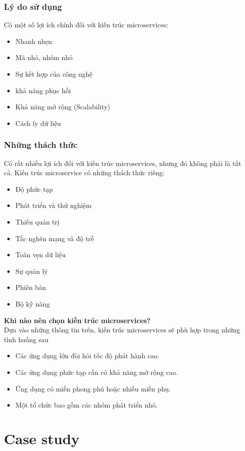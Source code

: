 \subsubsection{Lý do sử dụng}
Có một số lợi ích chính đối với kiến trúc microservices:
\begin{itemize}
    \item Nhanh nhẹn
    \item Mã nhỏ, nhóm nhỏ
    \item Sự kết hợp của công nghệ
    \item khả năng phục hồi
    \item Khả năng mở rộng (Scalability)
    \item Cách ly dữ liệu
\end{itemize}
\subsubsection{Những thách thức}
Có rất nhiều lợi ích đối với kiến trúc microservices, nhưng đó không phải là tất cả. Kiến trúc microservice có những thách thức riêng:
\begin{itemize}
    \item Độ phức tạp
    \item Phát triển và thử nghiệm
    \item Thiếu quản trị
    \item Tắc nghẽn mạng và độ trễ
    \item Toàn vẹn dữ liệu
    \item Sự quản lý
    \item Phiên bản
    \item Bộ kỹ năng    
\end{itemize}
\textbf{Khi nào nên chọn kiến trúc microservices?}\\[0.5cm]
Dựa vào những thông tin trên, kiến trúc microservices sẽ phù hợp trong những tình huống sau
\begin{itemize}
    \item Các ứng dụng lớn đòi hỏi tốc độ phát hành cao.
    \item Các ứng dụng phức tạp cần có khả năng mở rộng cao.
    \item Ứng dụng có miền phong phú hoặc nhiều miền phụ.
    \item Một tổ chức bao gồm các nhóm phát triển nhỏ.    
\end{itemize}

\newpage
\section{Case study}
